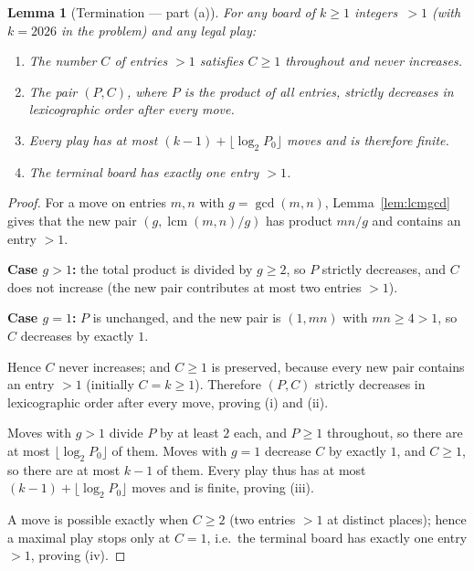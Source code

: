 \documentclass{article}
\newtheorem{lemma}[theorem]{Lemma}
\DeclareMathOperator{\lcm}{lcm}
\begin{document}
\begin{lemma}[Termination --- part (a)]\label{lem:term}
For any board of $k\geq 1$ integers~${}>1$ (with $k=2026$ in the problem) and any legal play:
\begin{enumerate}
\item[(i)] The number $C$ of entries $>1$ satisfies $C\geq 1$ throughout and never increases.
\item[(ii)] The pair $(P,C)$, where $P$ is the product of all entries, strictly decreases
            in lexicographic order after every move.
\item[(iii)] Every play has at most $(k-1)+\lfloor\log_2 P_0\rfloor$ moves and is therefore finite.
\item[(iv)] The terminal board has exactly one entry $>1$.
\end{enumerate}
\end{lemma}
\begin{proof}
For a move on entries $m,n$ with $g=\gcd(m,n)$, Lemma~\ref{lem:lcmgcd} gives that the new pair
$(g,\lcm(m,n)/g)$ has product $mn/g$ and contains an entry $>1$.

\textbf{Case $g>1$:} the total product is divided by $g\geq 2$, so $P$ strictly decreases, and
$C$ does not increase (the new pair contributes at most two entries $>1$).

\textbf{Case $g=1$:} $P$ is unchanged, and the new pair is $(1,mn)$ with $mn\geq 4>1$, so $C$
decreases by exactly $1$.

Hence $C$ never increases; and $C\geq 1$ is preserved, because every new pair contains an entry
$>1$ (initially $C=k\geq 1$). Therefore $(P,C)$ strictly decreases in lexicographic order after
every move, proving (i) and (ii).

Moves with $g>1$ divide $P$ by at least $2$ each, and $P\geq 1$ throughout, so there are at most
$\lfloor\log_2 P_0\rfloor$ of them. Moves with $g=1$ decrease $C$ by exactly $1$, and $C\geq 1$,
so there are at most $k-1$ of them. Every play thus has at most $(k-1)+\lfloor\log_2 P_0\rfloor$
moves and is finite, proving (iii).

A move is possible exactly when $C\geq 2$ (two entries $>1$ at distinct places); hence a maximal
play stops only at $C=1$, i.e.\ the terminal board has exactly one entry $>1$, proving (iv).
\end{proof}
\end{document}
